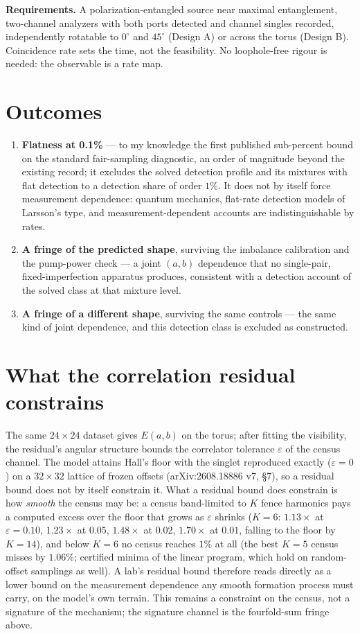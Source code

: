 \documentclass[10pt]{article}
\begin{document}
\textbf{Requirements.} A polarization-entangled source near maximal entanglement, two-channel analyzers with both ports detected and channel singles recorded, independently rotatable to $0^\circ$ and $45^\circ$ (Design A) or across the torus (Design B). Coincidence rate sets the time, not the feasibility. No loophole-free rigour is needed: the observable is a rate map.

\section*{Outcomes}
\begin{enumerate}[nosep]
\item \textbf{Flatness at 0.1\%} --- to my knowledge the first published sub-percent bound on the standard fair-sampling diagnostic, an order of magnitude beyond the existing record; it excludes the solved detection profile and its mixtures with flat detection to a detection share of order $1\%$. It does not by itself force measurement dependence: quantum mechanics, flat-rate detection models of Larsson's type, and measurement-dependent accounts are indistinguishable by rates.
\item \textbf{A fringe of the predicted shape}, surviving the imbalance calibration and the pump-power check --- a joint $(a,b)$ dependence that no single-pair, fixed-imperfection apparatus produces, consistent with a detection account of the solved class at that mixture level.
\item \textbf{A fringe of a different shape}, surviving the same controls --- the same kind of joint dependence, and this detection class is excluded as constructed.
\end{enumerate}

\section*{What the correlation residual constrains}
The same $24\times24$ dataset gives $E(a,b)$ on the torus; after fitting the visibility, the residual's angular structure bounds the correlator tolerance $\varepsilon$ of the census channel. The model attains Hall's floor with the singlet reproduced exactly ($\varepsilon=0$) on a $32\times32$ lattice of frozen offsets (arXiv:2608.18886 v7, \S7), so a residual bound does not by itself constrain it. What a residual bound does constrain is how \emph{smooth} the census may be: a census band-limited to $K$ fence harmonics pays a computed excess over the floor that grows as $\varepsilon$ shrinks ($K=6$: $1.13\times$ at $\varepsilon=0.10$, $1.23\times$ at $0.05$, $1.48\times$ at $0.02$, $1.70\times$ at $0.01$, falling to the floor by $K=14$), and below $K=6$ no census reaches $1\%$ at all (the best $K=5$ census misses by $1.06\%$; certified minima of the linear program, which hold on random-offset samplings as well). A lab's residual bound therefore reads directly as a lower bound on the measurement dependence any smooth formation process must carry, on the model's own terrain. This remains a constraint on the census, not a signature of the mechanism; the signature channel is the fourfold-sum fringe above.
\end{document}
